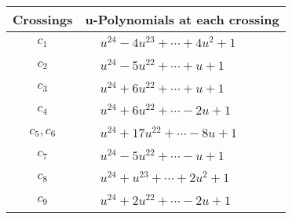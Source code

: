 \documentclass[1p]{elsarticle_modified}
\theoremstyle{definition}
\begin{document}
\begin{tabular}{m{50pt}|m{274pt}}
Crossings & \hspace{64pt}u-Polynomials at each crossing \\
\hline $$\begin{aligned}c_{1}\end{aligned}$$&$\begin{aligned}
&u^{24}-4 u^{23}+\cdots+4 u^2+1
\end{aligned}$\\
\hline $$\begin{aligned}c_{2}\end{aligned}$$&$\begin{aligned}
&u^{24}-5 u^{22}+\cdots+u+1
\end{aligned}$\\
\hline $$\begin{aligned}c_{3}\end{aligned}$$&$\begin{aligned}
&u^{24}+6 u^{22}+\cdots+u+1
\end{aligned}$\\
\hline $$\begin{aligned}c_{4}\end{aligned}$$&$\begin{aligned}
&u^{24}+6 u^{22}+\cdots-2 u+1
\end{aligned}$\\
\hline $$\begin{aligned}c_{5},c_{6}\end{aligned}$$&$\begin{aligned}
&u^{24}+17 u^{22}+\cdots-8 u+1
\end{aligned}$\\
\hline $$\begin{aligned}c_{7}\end{aligned}$$&$\begin{aligned}
&u^{24}-5 u^{22}+\cdots- u+1
\end{aligned}$\\
\hline $$\begin{aligned}c_{8}\end{aligned}$$&$\begin{aligned}
&u^{24}+u^{23}+\cdots+2 u^2+1
\end{aligned}$\\
\hline $$\begin{aligned}c_{9}\end{aligned}$$&$\begin{aligned}
&u^{24}+2 u^{22}+\cdots-2 u+1
\end{aligned}$\\

\end{tabular}
\end{document}
